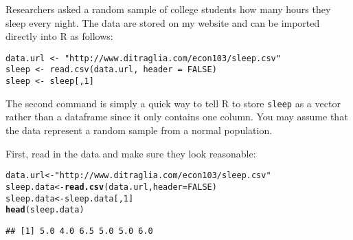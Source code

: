 \documentclass[addpoints,12pt]{exam}\usepackage[]{graphicx}\usepackage[]{color}
\makeatletter
\newcommand{\hlnum}[1]{\textcolor[rgb]{0.686,0.059,0.569}{#1}}%
\newcommand{\hlstr}[1]{\textcolor[rgb]{0.192,0.494,0.8}{#1}}%
\newcommand{\hlopt}[1]{\textcolor[rgb]{0,0,0}{#1}}%
\newcommand{\hlstd}[1]{\textcolor[rgb]{0.345,0.345,0.345}{#1}}%
\newcommand{\hlkwb}[1]{\textcolor[rgb]{0.69,0.353,0.396}{#1}}%
\newcommand{\hlkwc}[1]{\textcolor[rgb]{0.333,0.667,0.333}{#1}}%
\newcommand{\hlkwd}[1]{\textcolor[rgb]{0.737,0.353,0.396}{\textbf{#1}}}%
\newenvironment{kframe}{%
 \def\at@end@of@kframe{}%
 \ifinner\ifhmode%
  \def\at@end@of@kframe{\end{minipage}}%
  \begin{minipage}{\columnwidth}%
 \fi\fi%
 \def\FrameCommand##1{\hskip\@totalleftmargin \hskip-\fboxsep
 \colorbox{shadecolor}{##1}\hskip-\fboxsep
     \hskip-\linewidth \hskip-\@totalleftmargin \hskip\columnwidth}%
 \MakeFramed {\advance\hsize-\width
   \@totalleftmargin\z@ \linewidth\hsize
   \@setminipage}}%
 {\par\unskip\endMakeFramed%
 \at@end@of@kframe}
\newenvironment{knitrout}{}{} %
\makeatother
\begin{document}
\begin{questions}
\question Researchers asked a random sample of college students how many hours they sleep every night. The data are stored on my website and can be imported directly into R as follows:
\begin{verbatim}
data.url <- "http://www.ditraglia.com/econ103/sleep.csv"
sleep <- read.csv(data.url, header = FALSE)
sleep <- sleep[,1]
\end{verbatim}
The second command is simply a quick way to tell R to store \texttt{sleep} as a vector rather than a dataframe since it only contains one column. You may assume that the data represent a random sample from a normal population.
  \begin{solution}
  First, read in the data and make sure they look reasonable:
\begin{knitrout}
\color{fgcolor}\begin{kframe}
\begin{alltt}
\hlstd{data.url} \hlkwb{<-} \hlstr{"http://www.ditraglia.com/econ103/sleep.csv"}
\hlstd{sleep.data} \hlkwb{<-} \hlkwd{read.csv}\hlstd{(data.url,} \hlkwc{header} \hlstd{=} \hlnum{FALSE}\hlstd{)}
\hlstd{sleep.data} \hlkwb{<-} \hlstd{sleep.data[,}\hlnum{1}\hlstd{]}
\hlkwd{head}\hlstd{(sleep.data)}
\end{alltt}
\begin{verbatim}
## [1] 5.0 4.0 6.5 5.0 5.0 6.0
\end{verbatim}
\end{kframe}
\end{knitrout}
  \end{solution}
\end{questions}
\end{document}
